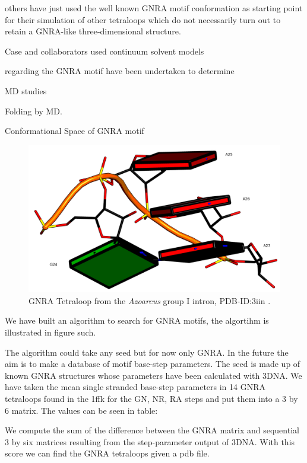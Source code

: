 others  have just  used  the  well known  GNRA  motif conformation  as
starting point for  their simulation of other tetraloops  which do not
necessarily turn out to retain a GNRA-like three-dimensional structure.



Case and collaborators used continuum solvent models 

regarding the GNRA motif have been undertaken to
determine 

MD studies\cite{depaul2010}

Folding by MD.

Conformational Space of GNRA motif


\begin{figure}
\centering 
\includegraphics[angle=0, scale=2]{Chapter5/gnra24.png}
\caption{GNRA Tetraloop from the \textit{Azoarcus} group I intron,
  PDB-ID:3iin   \cite{antonioli2010}.}
\end{figure}

We have built an algorithm to search for GNRA motifs, the algortihm is
illustrated in figure such.

The algorithm could take any seed but for now only GNRA. In the future
the aim is to make a database of motif base-step parameters.
The seed  is made  up of known  GNRA structures whose  parameters have
been calculated with 3DNA.
We have taken the mean single stranded base-step parameters in 14 GNRA
tetraloops found  in the 1ffk  for the GN,  NR, RA steps and  put them
into a 3 by 6 matrix. The values can be seen in table:

We  compute the  sum of  the difference  between the  GNRA  matrix and
sequential 3 by six  matrices resulting from the step-parameter output
of 3DNA. With  this score we can find the GNRA  tetraloops given a pdb
file.


